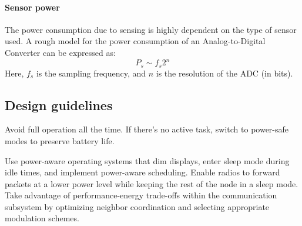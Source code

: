 \paragraph*{Sensor power}
The power consumption due to sensing is highly dependent on the type of sensor used. 
A rough model for the power consumption of an Analog-to-Digital Converter can be expressed as:
\[P_s\sim f_s2^n\]
Here, $f_s$ is the sampling frequency, and $n$ is the resolution of the ADC (in bits).

\subsection{Design guidelines}
Avoid full operation all the time. 
If there's no active task, switch to power-safe modes to preserve battery life.

Use power-aware operating systems that dim displays, enter sleep mode during idle times, and implement power-aware scheduling. 
Enable radios to forward packets at a lower power level while keeping the rest of the node in a sleep mode.
Take advantage of performance-energy trade-offs within the communication subsystem by optimizing neighbor coordination and selecting appropriate modulation schemes.